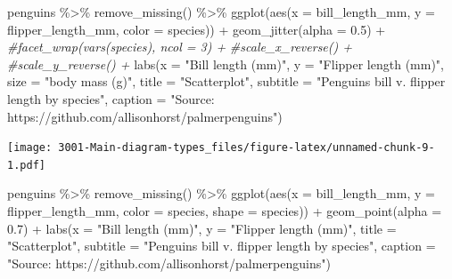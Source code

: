 \documentclass[
]{book}
\newenvironment{Shaded}{\begin{snugshade}}{\end{snugshade}}
\newcommand{\AttributeTok}[1]{\textcolor[rgb]{0.77,0.63,0.00}{#1}}
\newcommand{\CommentTok}[1]{\textcolor[rgb]{0.56,0.35,0.01}{\textit{#1}}}
\newcommand{\FloatTok}[1]{\textcolor[rgb]{0.00,0.00,0.81}{#1}}
\newcommand{\FunctionTok}[1]{\textcolor[rgb]{0.00,0.00,0.00}{#1}}
\newcommand{\NormalTok}[1]{#1}
\newcommand{\SpecialCharTok}[1]{\textcolor[rgb]{0.00,0.00,0.00}{#1}}
\newcommand{\StringTok}[1]{\textcolor[rgb]{0.31,0.60,0.02}{#1}}
\begin{document}
\begin{Shaded}
\begin{Highlighting}[]
\NormalTok{penguins }\SpecialCharTok{\%\textgreater{}\%}
    \FunctionTok{remove\_missing}\NormalTok{() }\SpecialCharTok{\%\textgreater{}\%}
    \FunctionTok{ggplot}\NormalTok{(}\FunctionTok{aes}\NormalTok{(}\AttributeTok{x =}\NormalTok{ bill\_length\_mm, }\AttributeTok{y =}\NormalTok{ flipper\_length\_mm, }\AttributeTok{color =}\NormalTok{ species)) }\SpecialCharTok{+}
    \FunctionTok{geom\_jitter}\NormalTok{(}\AttributeTok{alpha =} \FloatTok{0.5}\NormalTok{) }\SpecialCharTok{+}
    \CommentTok{\#facet\_wrap(vars(species), ncol = 3) +}
    \CommentTok{\#scale\_x\_reverse() +}
    \CommentTok{\#scale\_y\_reverse() +}
    \FunctionTok{labs}\NormalTok{(}\AttributeTok{x =} \StringTok{"Bill length (mm)"}\NormalTok{, }
         \AttributeTok{y =} \StringTok{"Flipper length (mm)"}\NormalTok{,}
         \AttributeTok{size =} \StringTok{"body mass (g)"}\NormalTok{,}
        \AttributeTok{title =} \StringTok{"Scatterplot"}\NormalTok{, }
        \AttributeTok{subtitle =} \StringTok{"Penguins bill v. flipper length by species"}\NormalTok{,}
        \AttributeTok{caption =} \StringTok{"Source: https://github.com/allisonhorst/palmerpenguins"}\NormalTok{)}
\end{Highlighting}
\end{Shaded}

\texttt{[image: 3001-Main-diagram-types\_files/figure-latex/unnamed-chunk-9-1.pdf]}

\begin{Shaded}
\begin{Highlighting}[]
\NormalTok{penguins }\SpecialCharTok{\%\textgreater{}\%}
    \FunctionTok{remove\_missing}\NormalTok{() }\SpecialCharTok{\%\textgreater{}\%}
    \FunctionTok{ggplot}\NormalTok{(}\FunctionTok{aes}\NormalTok{(}\AttributeTok{x =}\NormalTok{ bill\_length\_mm, }\AttributeTok{y =}\NormalTok{ flipper\_length\_mm,}
              \AttributeTok{color =}\NormalTok{ species, }\AttributeTok{shape =}\NormalTok{ species)) }\SpecialCharTok{+}
    \FunctionTok{geom\_point}\NormalTok{(}\AttributeTok{alpha =} \FloatTok{0.7}\NormalTok{) }\SpecialCharTok{+}
    \FunctionTok{labs}\NormalTok{(}\AttributeTok{x =} \StringTok{"Bill length (mm)"}\NormalTok{, }
         \AttributeTok{y =} \StringTok{"Flipper length (mm)"}\NormalTok{,}
        \AttributeTok{title =} \StringTok{"Scatterplot"}\NormalTok{, }
        \AttributeTok{subtitle =} \StringTok{"Penguins bill v. flipper length by species"}\NormalTok{,}
        \AttributeTok{caption =} \StringTok{"Source: https://github.com/allisonhorst/palmerpenguins"}\NormalTok{)}
\end{Highlighting}
\end{Shaded}
\end{document}

